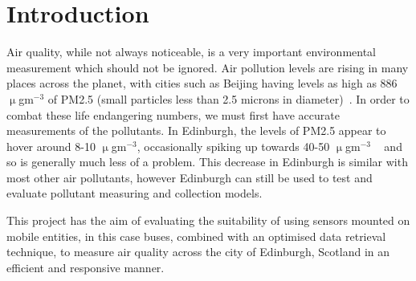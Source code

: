 \section{Introduction}\label{intro}


Air quality, while not always noticeable, is a very important environmental measurement which should not be ignored. Air pollution levels are rising in many places across the planet, with cities such as Beijing having levels as high as 886 $\upmu$gm$^{-3}$ of PM2.5 (small particles less than 2.5 microns in diameter)~\cite{beijinghightwitter}. In order to combat these life endangering numbers, we must first have accurate measurements of the pollutants. In Edinburgh, the levels of PM2.5 appear to hover around 8-10 $\upmu$gm$^{-3}$, occasionally spiking up towards 40-50 $\upmu$gm$^{-3}$ ~\cite{pm2point5inscotland} and so is generally much less of a problem. This decrease in Edinburgh is similar with most other air pollutants, however Edinburgh can still be used to test and evaluate pollutant measuring and collection models. 

This project has the aim of evaluating the suitability of using sensors mounted on mobile entities, in this case buses, combined with an optimised data retrieval technique, to measure air quality across the city of Edinburgh, Scotland in an efficient and responsive manner. 

